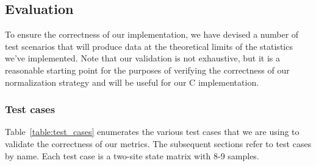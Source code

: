 \documentclass[12pt]{article}
\begin{document}
\subsection{Evaluation}
To ensure the correctness of our implementation, we have devised a number of
test scenarios that will produce data at the theoretical limits of the
statistics we've implemented. Note that our validation is not exhaustive, but it
is a reasonable starting point for the purposes of verifying the correctness of
our normalization strategy and will be useful for our C implementation.

\subsubsection{Test cases}
Table~\ref{table:test_cases} enumerates the various test cases that we are using
to validate the correctness of our metrics. The subsequent sections refer to
test cases by name. Each test case is a two-site state matrix with 8-9 samples.
\end{document}
